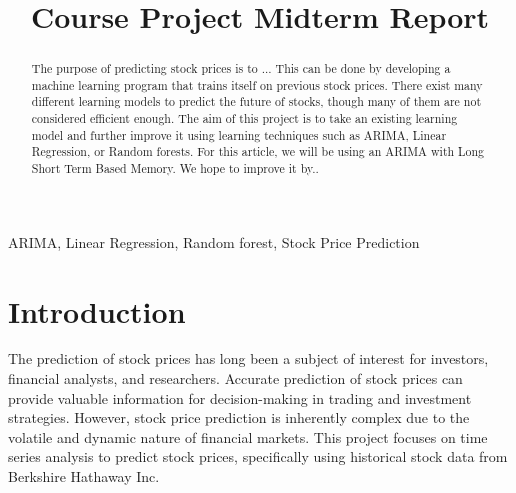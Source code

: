 \documentclass[conference]{IEEEtran}
\begin{document}
\title{Course Project Midterm Report\\

}

\author{
\and
{}
\and
{}
\and
{}
}

\maketitle

\begin{abstract}
The purpose of predicting stock prices is to ...  This can be done by developing a machine learning program that trains itself on previous stock prices.  There exist many different learning models to predict the future of stocks, though many of them are not considered efficient enough.  The aim of this project is to take an existing learning model and further improve it using learning techniques such as ARIMA, Linear Regression, or Random forests.  For this article, we will be using an ARIMA with Long Short Term Based Memory.  We hope to improve it by..
\end{abstract}

\begin{IEEEkeywords}
ARIMA, Linear Regression, Random forest, Stock Price Prediction
\end{IEEEkeywords}

\section{Introduction}
The prediction of stock prices has long been a subject of interest for investors, financial analysts, and researchers. Accurate prediction of stock prices can provide valuable information for decision-making in trading and investment strategies. However, stock price prediction is inherently complex due to the volatile and dynamic nature of financial markets. This project focuses on time series analysis to predict stock prices, specifically using historical stock data from Berkshire Hathaway Inc.
\end{document}
